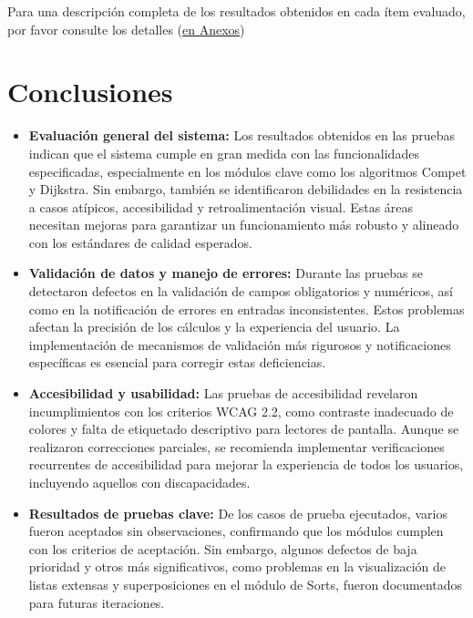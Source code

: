 \documentclass[stu, 12pt, letterpaper, donotrepeattitle, floatsintext, natbib]{apa7}
\begin{document}
\noindent Para una descripción completa de los resultados obtenidos en cada ítem evaluado, por favor consulte los detalles (\hyperref[tab:reporte_usabilidad]{en Anexos})

\newpage
\section{Conclusiones}

\begin{itemize}
    \item \textbf{Evaluaci\'on general del sistema:} Los resultados obtenidos en las pruebas indican que el sistema cumple en gran medida con las funcionalidades especificadas, especialmente en los m\'odulos clave como los algoritmos Compet y Dijkstra. Sin embargo, tambi\'en se identificaron debilidades en la resistencia a casos at\'ipicos, accesibilidad y retroalimentaci\'on visual. Estas \'areas necesitan mejoras para garantizar un funcionamiento m\'as robusto y alineado con los est\'andares de calidad esperados.

    \item \textbf{Validaci\'on de datos y manejo de errores:} Durante las pruebas se detectaron defectos en la validaci\'on de campos obligatorios y num\'ericos, as\'i como en la notificaci\'on de errores en entradas inconsistentes. Estos problemas afectan la precisi\'on de los c\'alculos y la experiencia del usuario. La implementaci\'on de mecanismos de validaci\'on m\'as rigurosos y notificaciones espec\'ificas es esencial para corregir estas deficiencias.

    \item \textbf{Accesibilidad y usabilidad:} Las pruebas de accesibilidad revelaron incumplimientos con los criterios WCAG 2.2, como contraste inadecuado de colores y falta de etiquetado descriptivo para lectores de pantalla. Aunque se realizaron correcciones parciales, se recomienda implementar verificaciones recurrentes de accesibilidad para mejorar la experiencia de todos los usuarios, incluyendo aquellos con discapacidades.

    \item \textbf{Resultados de pruebas clave:} De los casos de prueba ejecutados, varios fueron aceptados sin observaciones, confirmando que los m\'odulos cumplen con los criterios de aceptaci\'on. Sin embargo, algunos defectos de baja prioridad y otros m\'as significativos, como problemas en la visualizaci\'on de listas extensas y superposiciones en el m\'odulo de Sorts, fueron documentados para futuras iteraciones.


\end{itemize}
\end{document}
